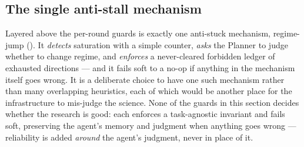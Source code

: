 \subsection{The single anti-stall mechanism}

Layered above the per-round guards is exactly one anti-stuck mechanism,
regime-jump (). It \emph{detects} saturation with a simple
counter, \emph{asks} the Planner to judge whether to change regime, and
\emph{enforces} a never-cleared forbidden ledger of exhausted directions --- and it
fails soft to a no-op if anything in the mechanism itself goes wrong. It is a
deliberate choice to have one such mechanism rather than many overlapping
heuristics, each of which would be another place for the infrastructure to
mis-judge the science. None of the guards in this section decides whether the
research is good: each enforces a task-agnostic invariant and fails soft,
preserving the agent's memory and judgment when anything goes wrong --- reliability
is added \emph{around} the agent's judgment, never in place of it.
